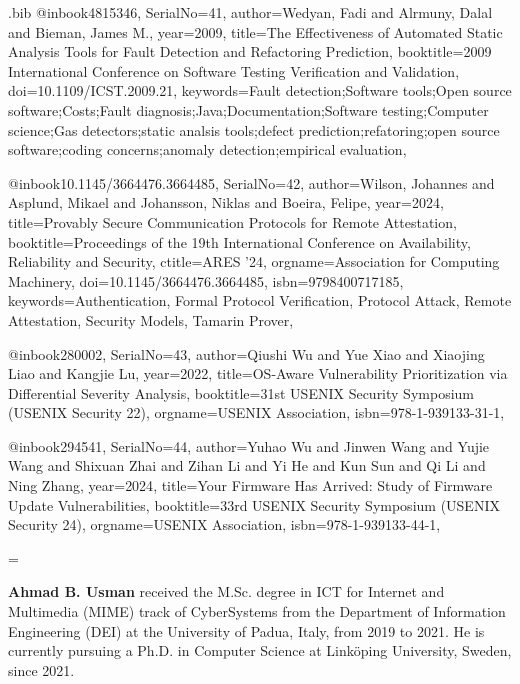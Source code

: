 \documentclass[fleqn,s1,names,tex]{neptune}
\begin{document}
\begin{bibwrite}{\jobname.bib}
@inbook{4815346,
SerialNo={41},
author={Wedyan, Fadi and Alrmuny, Dalal and Bieman, James M.},
 year={2009},
title={The Effectiveness of Automated Static Analysis Tools for Fault
  Detection and Refactoring Prediction},
booktitle={2009 International Conference on Software Testing Verification and   Validation},
doi={10.1109/ICST.2009.21},
 keywords={Fault detection;Software tools;Open source software;Costs;Fault
  diagnosis;Java;Documentation;Software testing;Computer science;Gas
  detectors;static analsis tools;defect prediction;refatoring;open source
  software;coding concerns;anomaly detection;empirical evaluation},
}


@inbook{10.1145/3664476.3664485,
SerialNo={42},
author={Wilson, Johannes and Asplund, Mikael and Johansson, Niklas and Boeira,
  Felipe},
 year={2024},
title={Provably Secure Communication Protocols for Remote Attestation},
booktitle={Proceedings of the 19th International Conference on Availability,   Reliability and Security},
ctitle={ARES '24},
 orgname={Association for Computing Machinery},
doi={10.1145/3664476.3664485},
 isbn={9798400717185},
 keywords={Authentication, Formal Protocol Verification, Protocol Attack,
  Remote Attestation, Security Models, Tamarin Prover},
}


@inbook{280002,
SerialNo={43},
author={Qiushi Wu and Yue Xiao and Xiaojing Liao and Kangjie Lu},
 year={2022},
title={{OS}-Aware Vulnerability Prioritization via Differential Severity
  Analysis},
booktitle={31st USENIX Security Symposium (USENIX Security 22)},
 orgname={USENIX Association},
 isbn={978-1-939133-31-1},
}


@inbook{294541,
SerialNo={44},
author={Yuhao Wu and Jinwen Wang and Yujie Wang and Shixuan Zhai and Zihan Li
  and Yi He and Kun Sun and Qi Li and Ning Zhang},
 year={2024},
title={Your Firmware Has Arrived:  Study of Firmware Update Vulnerabilities},
booktitle={33rd USENIX Security Symposium (USENIX Security 24)},
 orgname={USENIX Association},
 isbn={978-1-939133-44-1},
}



\end{bibwrite}



\newbox\uncitedrefsbox
\setbox\uncitedrefsbox=\vbox{}


%





\begin{biography}
\textbf{Ahmad B. Usman} received the M.Sc. degree in ICT for Internet and Multimedia (MIME) track of CyberSystems from the Department of Information Engineering (DEI) at the University of Padua, Italy, from 2019 to 2021. He is currently pursuing a Ph.D. in Computer Science at Link\"oping University, Sweden, since 2021.%
\end{biography}
\end{document}
